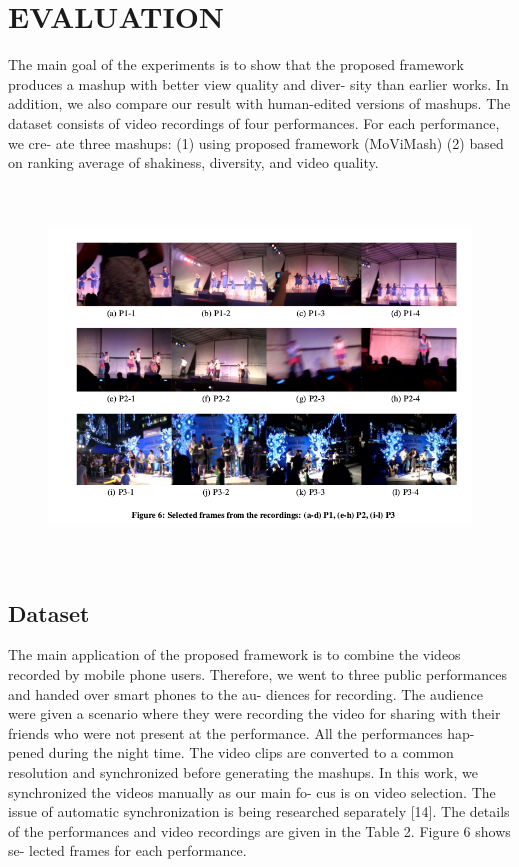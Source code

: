 \documentclass{sig-alternate}
\begin{document}
\section{EVALUATION}
The main goal of the experiments is to show that the proposed
framework produces a mashup with better view quality and diver-
sity than earlier works. In addition, we also compare our result with
human-edited versions of mashups. The dataset consists of video
recordings of four performances. For each performance, we cre-
ate three mashups: (1) using proposed framework (MoViMash) (2)
based on ranking average of shakiness, diversity, and video quality.


\begin{figure}
\centering
\includegraphics[height = 10cm,width=16cm]{fig6.png}
\end{figure}

\subsection{Dataset}

The main application of the proposed framework is to combine
the videos recorded by mobile phone users. Therefore, we went to
three public performances and handed over smart phones to the au-
diences for recording. The audience were given a scenario where
they were recording the video for sharing with their friends who
were not present at the performance. All the performances hap-
pened during the night time. The video clips are converted to a
common resolution and synchronized before generating the mashups.
In this work, we synchronized the videos manually as our main fo-
cus is on video selection. The issue of automatic synchronization is
being researched separately [14]. The details of the performances
and video recordings are given in the Table 2. Figure 6 shows se-
lected frames for each performance.
\end{document}
